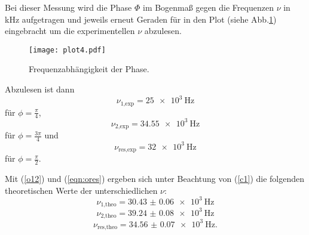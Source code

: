 Bei dieser Messung wird die Phase $\Phi$ im Bogenmaß gegen die Frequenzen $\nu$ in kHz aufgetragen
und jeweils erneut Geraden für in den Plot (siehe Abb.\ref{fig:plot4}) eingebracht um die
experimentellen $\nu$ abzulesen.
\begin{figure}[H]
  \centering
  \texttt{[image: plot4.pdf]}
  \caption{Frequenzabhängigkeit der Phase.}
  \label{fig:plot4}
\end{figure}
Abzulesen ist dann
\begin{equation*}
  \nu_{\text{1,exp}} = \SI{25e3}{\hertz}
\end{equation*}
für $\phi = \frac{\pi}{4}$,
\begin{equation*}
  \nu_{\text{2,exp}} = \SI{34.55e3}{\hertz}
\end{equation*}
für $\phi = \frac{3\pi}{4}$ und
\begin{equation*}
  \nu_{\text{res,exp}} = \SI{32e3}{\hertz}
\end{equation*}
für $\phi = \frac{\pi}{2}$.

Mit (\ref{o12}) und (\ref{eqn:ores}) ergeben sich unter Beachtung von (\ref{c1})
die folgenden theoretischen Werte der unterschiedlichen $\nu$:
\begin{equation*}
  \nu_{\text{1,theo}} = \SI{30.43(6)e3}{\hertz}
\end{equation*}
\begin{equation*}
  \nu_{\text{2,theo}} = \SI{39.24(8)e3}{\hertz}
\end{equation*}
\begin{equation*}
  \nu_{\text{res,theo}} = \SI{34.56(7)e3}{\hertz}.
\end{equation*}







